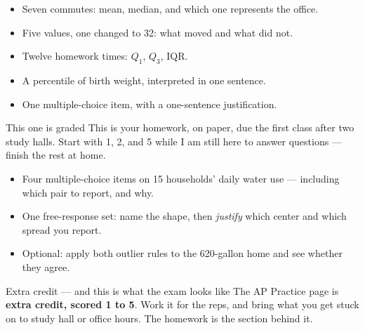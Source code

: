 \documentclass[aspectratio=169, 11pt]{beamer}
\begin{document}
\begin{frame}[t, plain]
  \begin{itemize}\setlength{\itemsep}{5pt}
    \item Seven commutes: mean, median, and which one represents the office.
    \item Five values, one changed to 32: what moved and what did not.
    \item Twelve homework times: $Q_1$, $Q_3$, IQR.
    \item A percentile of birth weight, interpreted in one sentence.
    \item One multiple-choice item, with a one-sentence justification.
  \end{itemize}
  \begin{block}{This one is graded}
    This is your  homework, on paper, due the first class after two study halls.
    Start with 1, 2, and 5 while I am still here to answer questions --- finish the rest at home.
  \end{block}
\end{frame}

\begin{frame}[t, plain]
  \begin{itemize}\setlength{\itemsep}{5pt}
    \item Four multiple-choice items on 15 households' daily water use --- including which
          pair to report, and why.
    \item One free-response set: name the shape, then \emph{justify} which center and which
          spread you report.
    \item Optional: apply both outlier rules to the 620-gallon home and see whether they agree.
  \end{itemize}
  \begin{block}{Extra credit --- and this is what the exam looks like}
    The AP Practice page is \textbf{extra credit, scored 1 to 5}. Work it for the reps, and bring what you
    get stuck on to study hall or office hours. The  homework is the section
    behind it.
  \end{block}
\end{frame}
\end{document}

